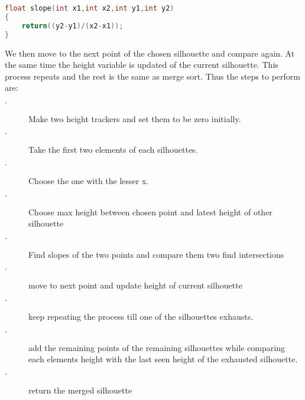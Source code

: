 \documentclass{article}
\begin{document}
\begin{lstlisting}[language=c, caption=recursive function]
float slope(int x1,int x2,int y1,int y2)
{
    return((y2-y1)/(x2-x1));
}
\end{lstlisting}

We then move to the next point of the chosen silhouette and compare again. At the same time the height variable is updated of the current silhouette. This process repeats and the rest is the same as merge sort.
Thus the steps to perform are:
\begin{description}
  \item[$\cdot$] Make two height trackers and set them to be zero initially.
  \item[$\cdot$] Take the first two elements of each silhouettes.
  \item[$\cdot$] Choose the one with the lesser x.
  \item[$\cdot$] Choose max height between chosen point and latest height of other silhouette
  \item[$\cdot$] Find slopes of the two points and compare them two find intersections
  \item[$\cdot$] move to next point and update height of current silhouette
  \item[$\cdot$] keep repeating the process till one of the silhouettes exhausts.
  \item[$\cdot$] add the remaining points of the remaining silhouettes while comparing each elements height with the last seen height of the exhausted silhouette.
  \item[$\cdot$] return the merged silhouette
\end{description}
\end{document}
